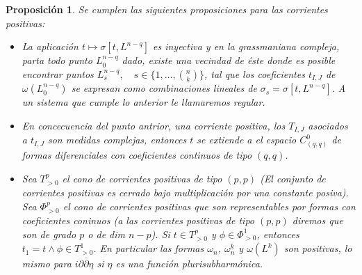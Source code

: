 \documentclass[letterpaper]{article}
\newtheorem{prop}[teorema]{Proposici\'on}
\begin{document}
\begin{prop}
Se cumplen las siguientes proposiciones para las corrientes positivas:
    \begin{itemize}
        \item[1] La aplicación $t\mapsto\sigma[t,L^{n-q}]$ es inyectiva y en la grassmaniana compleja, parta todo punto $L^{n-q}_{0}$ dado, existe una vecindad de éste donde es posible encontrar puntos $L^{n-q}_s,\quad s\in\{1,\dots,{n\choose k}\}$, tal que los coeficientes $t_{I,J}$ de $\omega(L^{n-q}_{0})$ se expresan como combinaciones lineales de $\sigma_s=\sigma[t,L^{n-q}]$. A un sistema que cumple lo anterior le llamaremos \emph{regular}.

        \item[2] En concecuencia del punto antrior, una corriente positiva, los $T_{I,J}$ asociados a $t_{I,J}$ son medidas complejas, entonces $t$ se extiende a el espacio $C^{0}_{(q,q)}$ de formas diferenciales con coeficientes continuos de tipo $(q,q)$.

        \item[3] Sea $T_{>0}^{p}$ el cono de corrientes positivas de tipo $(p,p)$ (El conjunto de corrientes positivas es cerrado bajo multiplicación por una constante posiva). Sea $\Phi^{p}_{>0}$ el cono de corrientes positivas que son representables por formas con coeficientes coninuos (a las corrientes positivas de tipo $(p,p)$ diremos que son de grado $p$ o de dim $n-p$). Si $t\in T^{p}_{>0}$ y $\phi\in\Phi^{1}_{>0}$, entonces $t_1=t\wedge\phi\in T^{1}_{>0}$. En particular las formas $\omega_n$, $\omega^{k}_n$ y $\omega(L^k)$ son positivas, lo mismo para $i\partial\overline{\partial}\eta$ si $\eta$ es una función plurisubharmónica.


\end{itemize}
\end{prop}
\end{document}
